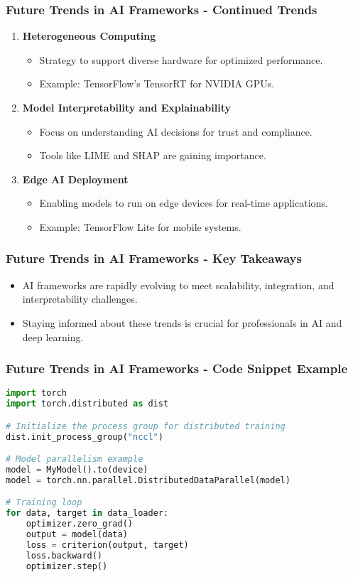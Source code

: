 \documentclass[aspectratio=169]{beamer}
\begin{document}
\begin{frame}[fragile]
    \frametitle{Future Trends in AI Frameworks - Continued Trends}
    \begin{enumerate}[resume]
        \item \textbf{Heterogeneous Computing}
            \begin{itemize}
                \item Strategy to support diverse hardware for optimized performance.
                \item Example: TensorFlow's TensorRT for NVIDIA GPUs.
            \end{itemize}

        \item \textbf{Model Interpretability and Explainability}
            \begin{itemize}
                \item Focus on understanding AI decisions for trust and compliance.
                \item Tools like LIME and SHAP are gaining importance.
            \end{itemize}

        \item \textbf{Edge AI Deployment}
            \begin{itemize}
                \item Enabling models to run on edge devices for real-time applications.
                \item Example: TensorFlow Lite for mobile systems.
            \end{itemize}
    \end{enumerate}
\end{frame}

\begin{frame}[fragile]
    \frametitle{Future Trends in AI Frameworks - Key Takeaways}
    \begin{itemize}
        \item AI frameworks are rapidly evolving to meet scalability, integration, and interpretability challenges.
        \item Staying informed about these trends is crucial for professionals in AI and deep learning.
    \end{itemize}
\end{frame}

\begin{frame}[fragile]
    \frametitle{Future Trends in AI Frameworks - Code Snippet Example}
    \begin{lstlisting}[language=Python]
import torch
import torch.distributed as dist

# Initialize the process group for distributed training
dist.init_process_group("nccl")

# Model parallelism example
model = MyModel().to(device)
model = torch.nn.parallel.DistributedDataParallel(model)

# Training loop
for data, target in data_loader:
    optimizer.zero_grad()
    output = model(data)
    loss = criterion(output, target)
    loss.backward()
    optimizer.step()
    \end{lstlisting}
\end{frame}
\end{document}
